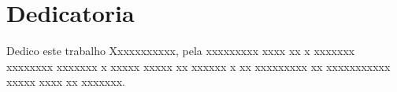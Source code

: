\section{Dedicatoria}
Dedico este trabalho Xxxxxxxxxxx, pela xxxxxxxxx xxxx xx x
xxxxxxx xxxxxxxx xxxxxxx x xxxxx xxxxx xx xxxxxx x xx xxxxxxxxx xx
xxxxxxxxxxx xxxxx xxxx xx xxxxxxx.